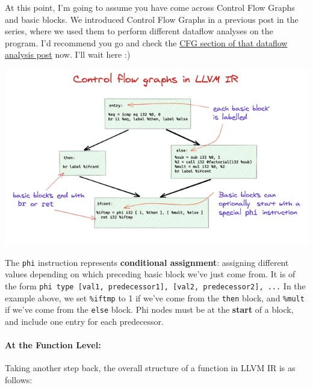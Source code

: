 At this point, I'm going to assume you have come across Control Flow
Graphs and basic blocks. We introduced Control Flow Graphs in a previous
post in the series, where we used them to perform different dataflow
analyses on the program. I'd recommend you go and check the
\href{http://mukulrathi.co.uk/create-your-own-programming-language/data-race-dataflow-analysis/\#control-flow-graph}{CFG
section of that dataflow analysis post} now. I'll wait here :)

{
\href{https://mukulrathi.com/static/6a6edf6d916150ea4de92c0fc1a68e1a/11864/factorial-cfg.png}{{}
\includegraphics[width=\linewidth]{08_files/factorial-cfg.png}} }

The \texttt{phi} instruction represents \textbf{conditional assignment}:
assigning different values depending on which preceding basic block
we've just come from. It is of the form
\texttt{phi\ type\ {[}val1,\ predecessor1{]},\ {[}val2,\ predecessor2{]},\ ...}
In the example above, we set \texttt{\%iftmp} to 1 if we've come from
the \texttt{then} block, and \texttt{\%mult} if we've come from the
\texttt{else} block. Phi nodes must be at the \textbf{start} of a block,
and include one entry for each predecessor.

\hypertarget{at-the-function-level}{%
\paragraph{\texorpdfstring{\protect\hyperlink{at-the-function-level}{}At
the Function
Level:}{At the Function Level:}}\label{at-the-function-level}}

Taking another step back, the overall structure of a function in LLVM IR
is as follows:

